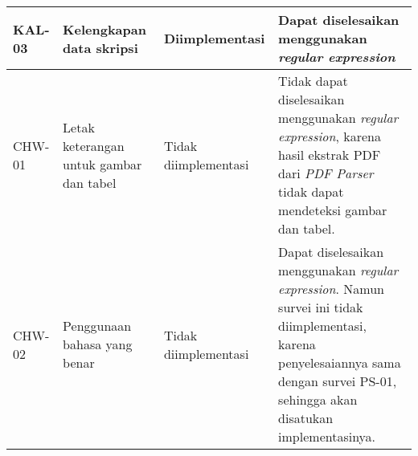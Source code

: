 \begin{table}[H]
\begin{center}
\begin{tabular}{|p{1.5 cm}|>{\raggedright} p{4 cm}| p{2.5 cm}| p{6.5 cm}|}
		\hline 
		KAL-03 & Kelengkapan data skripsi & Diimplementasi & Dapat diselesaikan menggunakan \textit{regular expression} \newline \\ 
		\hline 
		CHW-01 & Letak keterangan untuk gambar dan tabel & Tidak \newline diimplementasi & Tidak dapat diselesaikan menggunakan \textit{regular expression}, karena hasil ekstrak PDF dari \textit{PDF Parser} tidak dapat mendeteksi gambar dan tabel.\newline \\ 
		\hline 
		CHW-02 & Penggunaan bahasa yang benar & Tidak \newline diimplementasi & Dapat diselesaikan menggunakan \textit{regular expression}. Namun survei ini tidak diimplementasi, karena penyelesaiannya sama dengan survei PS-01, sehingga akan disatukan implementasinya. \newline \\
		\hline  
		\end{tabular}
	\end{center}
\end{table}

